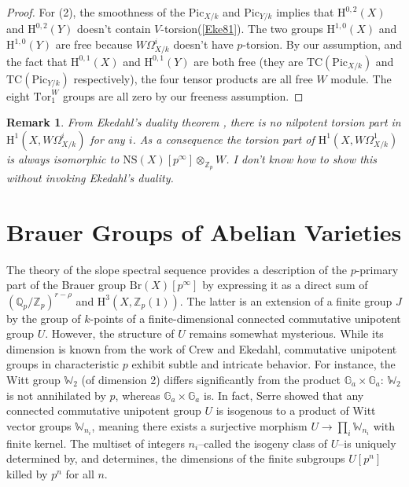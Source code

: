 \documentclass[a4paper,12pt,twoside]{report}
\newtheorem{remark}[theorem]{Remark}
\newcommand{\Q}{\mathbb{Q}}
\newcommand{\Z}{\mathbb{Z}}
\newcommand{\G}{\mathbb{G}}
\newcommand{\Pic}{\mathrm{Pic}}
\newcommand{\Br}{\mathrm{Br}}
\newcommand{\NS}{\mathrm{NS}}
\newcommand{\HH}{\mathrm{H}}
\newcommand{\TC}{\mathrm{TC}}
\newcommand{\Tor}{\mathrm{Tor}}
\newcommand{\W}{\mathbb{W}}
\begin{document}
\begin{proof}
For (2), the smoothness of the $\Pic_{X/k}$ and $\Pic_{Y/k}$ implies that 
$\HH^{0,2}(X)$ and $\HH^{0,2}(Y)$ doesn't contain $V$-torsion(\ref{Eke81}). 
The two groups $\HH^{1,0}(X)$ and $\HH^{1,0}(Y)$ are free because 
$W\Omega^i_{X/k}$ doesn't have $p$-torsion. 
By our assumption, and the fact that $\HH^{0,1}(X)$ and $\HH^{0,1}(Y)$ are both free 
(they are $\TC(\Pic_{X/k})$ and $\TC(\Pic_{Y/k})$ respectively), 
the four tensor products are all free $W$ module. 
The eight $\Tor_1^W$ groups are all zero by our freeness assumption. \end{proof}

\begin{remark}
    From Ekedahl's duality theorem \cite{Ek1}, there is no nilpotent torsion part in $\HH^1(X,W\Omega^i_{X/k})$ for any $i$. 
    As a consequence the torsion part of $\HH^1(X,W\Omega^1_{X/k})$ is always isomorphic to 
    $\NS(X)[p^\infty]\otimes_{\Z_p} W$. 
    I don't know how to show this without invoking Ekedahl's duality. 
\end{remark}

\part{Brauer Groups of Abelian Varieties}\label{Part2}

The theory of the slope spectral sequence provides a description of the $p$-primary part of the Brauer group 
$\Br(X)[p^\infty]$ by expressing it as a direct sum of $(\Q_p/\Z_p)^{r-\rho}$ and $\HH^3(X, \Z_p(1))$. 
The latter is an extension of a finite group $J$ by the group of $k$-points 
of a finite-dimensional connected commutative unipotent group $U$. 
However, the structure of $U$ remains somewhat mysterious. 
While its dimension is known from the work of Crew and Ekedahl, commutative unipotent groups in characteristic $p$ 
exhibit subtle and intricate behavior. For instance, the Witt group $\W_2$ (of dimension 2) differs significantly from the product $\G_a \times \G_a$: $\W_2$ is 
not annihilated by $p$, whereas $\G_a \times \G_a$ is. In fact, Serre showed that any connected 
commutative unipotent group $U$ is isogenous to a product of Witt vector groups $\W_{n_i}$, 
meaning there exists a surjective morphism $U \to \prod_i \W_{n_i}$ with finite kernel. 
The multiset of integers ${n_i}$--called the isogeny class of $U$--is uniquely determined by, 
and determines, the dimensions of the finite subgroups $U[p^n]$ killed by $p^n$ for all $n$.
\end{document}
